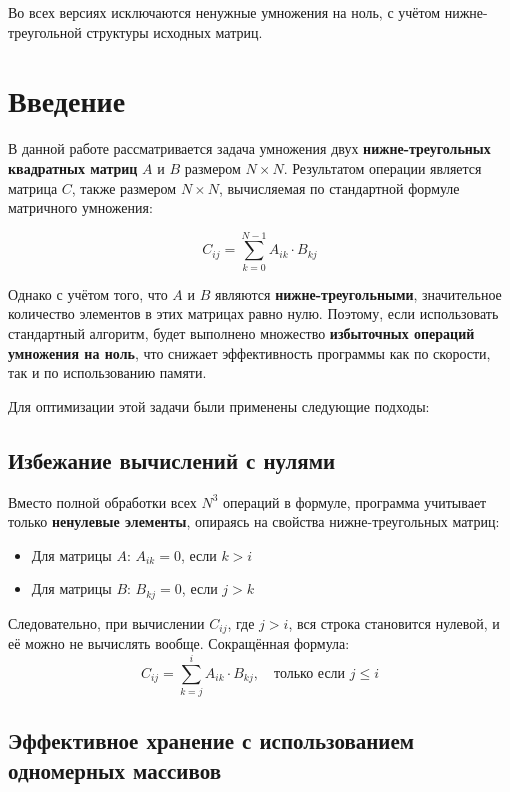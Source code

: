 \documentclass[14pt, russian]{matmex-diploma-custom}
\begin{document}
Во всех версиях исключаются ненужные умножения на ноль, с учётом нижне-треугольной структуры исходных матриц.

\section{Введение}
В данной работе рассматривается задача умножения двух \textbf{нижне-треугольных квадратных матриц} $A$ и $B$ размером $N \times N$. Результатом операции является матрица $C$, также размером $N \times N$, вычисляемая по стандартной формуле матричного умножения:

\begin{equation}
C_{ij} = \sum_{k=0}^{N-1} A_{ik} \cdot B_{kj}
\end{equation}

Однако с учётом того, что $A$ и $B$ являются \textbf{нижне-треугольными}, значительное количество элементов в этих матрицах равно нулю. Поэтому, если использовать стандартный алгоритм, будет выполнено множество \textbf{избыточных операций умножения на ноль}, что снижает эффективность программы как по скорости, так и по использованию памяти.

Для оптимизации этой задачи были применены следующие подходы:

\subsection{Избежание вычислений с нулями}
Вместо полной обработки всех $N^3$ операций в формуле, программа учитывает только \textbf{ненулевые элементы}, опираясь на свойства нижне-треугольных матриц:

\begin{itemize}
    \item Для матрицы $A$: $A_{ik} = 0$, если $k > i$
    \item Для матрицы $B$: $B_{kj} = 0$, если $j > k$
\end{itemize}

Следовательно, при вычислении $C_{ij}$, где $j > i$, вся строка становится нулевой, и её можно не вычислять вообще. Сокращённая формула:
\begin{equation}
C_{ij} = \sum_{k=j}^{i} A_{ik} \cdot B_{kj}, \quad \text{только если } j \leq i
\end{equation}

\subsection{Эффективное хранение с использованием одномерных массивов}
\end{document}
